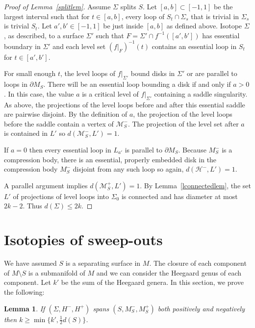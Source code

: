 \documentclass[12pt]{amsart}
\theoremstyle{plain}
\newtheorem{Lem}[Thm]{Lemma}
\theoremstyle{definition}
\begin{document}
\begin{proof}[Proof of Lemma~\ref{splitlem}]
Assume $\Sigma$ splits $S$.  Let $[a, b] \subset [-1,1]$ be the largest interval such that for $t \in [a,b]$, every loop of $S_t \cap \Sigma_s$ that is trivial in $\Sigma_s$ is trivial $S_t$.   Let $a',b' \in [-1,1]$ be just inside $[a,b]$ as defined above.  Isotope $\Sigma$, as described, to a surface $\Sigma'$ such that $F = \Sigma' \cap f^{-1}([a',b'])$ has essential boundary in $\Sigma'$ and each level set $(f|_F)^{-1}(t)$ contains an essential loop in $S_t$ for $t \in [a',b']$.  

For small enough $t$, the level loops of $f|_{\Sigma'}$ bound disks in $\Sigma'$ or are parallel to loops in $\partial M_S$.  There will be an essential loop bounding a disk if and only if $a > 0$.  In this case, the value $a$ is a critical level of $f|_{\Sigma'}$ containing a saddle singularity.  As above, the projections of the level loops before and after this essential saddle are pairwise disjoint.  By the definition of $a$, the projection of the level loops before the saddle contain a vertex of $\mathcal{M}_S^-$.  The projection of the level set after $a$ is contained in $L'$ so $d(\mathcal{M}_S^-,L') = 1$.  

If $a = 0$ then every essential loop in $L_{a'}$ is parallel to $\partial M_S$.  Because $M^-_S$ is a compression body, there is an essential, properly embedded disk in the compression body $M^-_S$ disjoint from any such loop so again, $d(\mathcal{H}^-,L') = 1$.

A parallel argument implies $d(\mathcal{M}_S^+,L') = 1$.  By Lemma~\ref{lconnectedlem}, the set $L'$ of projections of level loops into $\Sigma_0$ is connected and has diameter at most $2k-2$.  Thus $d(\Sigma) \leq 2k$.
\end{proof}





\section{Isotopies of sweep-outs}

We have assumed $S$ is a separating surface in $M$.  The closure of each component of $M \setminus S$ is a submanifold of $M$ and we can consider the Heegaard genus of each component.  Let $k'$ be the sum of the Heegaard genera.  In this section, we prove the following:

\begin{Lem}
\label{bothspanboundlem}
If $(\Sigma, H^-, H^+)$ spans $(S, M_S^-, M_S^+)$ both positively and negatively then $k \geq \min\{k', \frac{1}{2}d(S)\}$.
\end{Lem}
\end{document}

